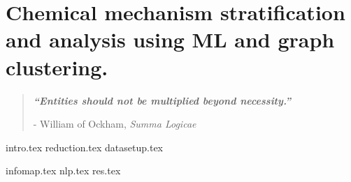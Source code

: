 

\chapter{ Chemical mechanism stratification and analysis using ML and graph clustering. }\label{ch4}

\blankpage
\restoregeometry
\vspace*{0.15\paperheight}


\begin{center}
\begin{quotation}
  \large{\emph{\textbf{``Entities should not be multiplied beyond necessity.''} }  }  \\
  \begin{flushright}
  - William of Ockham, \textit{Summa Logicae}
  \end{flushright}
 \end{quotation}
\end{center}
\newpage

\doublespacing

 {intro.tex}
 {reduction.tex}
  {datasetup.tex}

  {infomap.tex}
 {nlp.tex} %
  {res.tex}
 
\chapterbib

